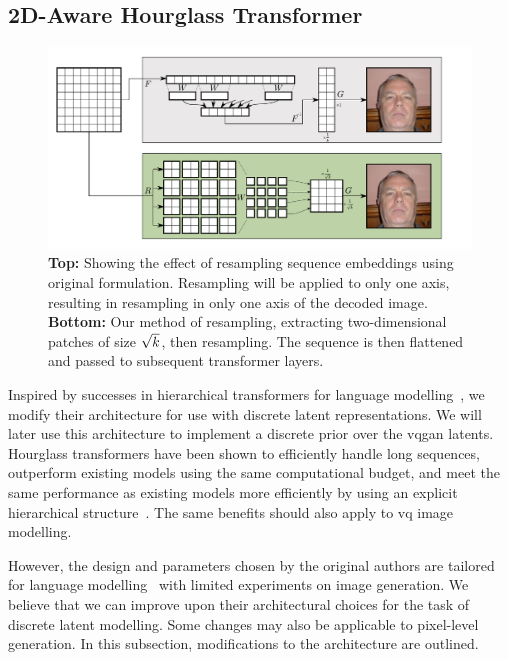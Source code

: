 \subsection{2D-Aware Hourglass Transformer}
\label{subsec:improvedHourglass}

\begin{figure}[htp]
    \label{fig:resample}
    \centering
    \includegraphics[width=\textwidth]{figures/resample.pdf}
    \caption{
        \textbf{Top:} Showing the effect of resampling sequence embeddings using
        original formulation. Resampling will be applied to only one axis,
        resulting in resampling in only one axis of the decoded image.
        \textbf{Bottom:} Our method of resampling, extracting 
        two-dimensional patches of size $\sqrt{k}$, then 
        resampling. The sequence is then flattened and passed to
        subsequent transformer layers.
    }
\end{figure}

Inspired by successes in hierarchical transformers for language
modelling~\cite{nawrot2021hierarchical}, we modify their architecture for use
with discrete latent representations. We will later use this architecture to
implement a discrete prior over the \gls{vqgan} latents. Hourglass transformers
have been shown to efficiently handle long sequences, outperform existing models
using the same computational budget, and meet the same performance as existing
models more efficiently by using an explicit hierarchical
structure~\cite{nawrot2021hierarchical}. The same benefits should also apply to
\gls{vq} image modelling. 

However, the design and parameters chosen by the original authors are tailored
for language modelling~\cite{nawrot2021hierarchical} with limited experiments on
image generation. We believe that we can improve upon their architectural
choices for the task of discrete latent modelling. Some changes may also be
applicable to pixel-level generation. In this subsection, modifications to the
architecture are outlined.

